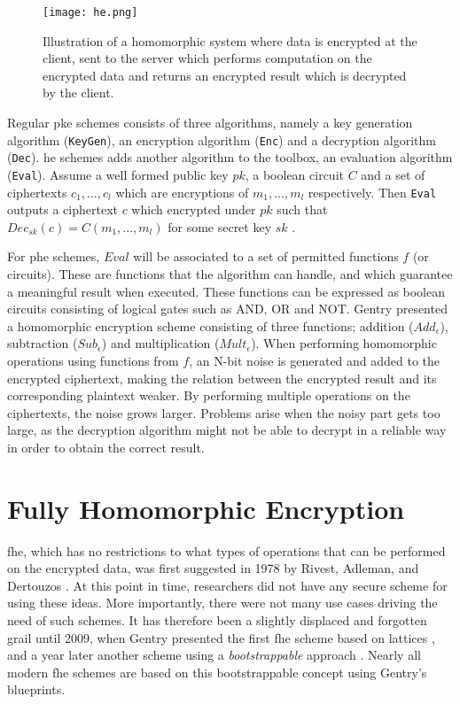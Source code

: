 \begin{figure}[h]
	\centering
	\texttt{[image: he.png]}
	\caption{Illustration of a homomorphic system where data is encrypted at the client, sent to the server which performs computation on the encrypted data and returns an encrypted result which is decrypted by the client.}
	\label{fig:he_ill}
\end{figure}

Regular \gls{pke} schemes consists of three algorithms, namely a key generation algorithm (\texttt{KeyGen}), an encryption algorithm (\texttt{Enc}) and a decryption algorithm (\texttt{Dec}). \gls{he} schemes adds another algorithm to the toolbox, an evaluation algorithm (\texttt{Eval}).  Assume a well formed public key $pk$, a boolean circuit $C$ and a set of ciphertexts $c_1, ..., c_l$ which are encryptions of $m_1, ..., m_l$ respectively. Then \texttt{Eval} outputs a ciphertext $c$ which encrypted under $pk$ such that $Dec_{sk}(c) = C(m_1, ..., m_l)$ for some secret key $sk$ \cite{damgaard2012secure}.


For \gls{phe} schemes, $Eval$ will be associated to a set of permitted functions $f$ (or circuits). These are functions that the algorithm can handle, and which guarantee a meaningful result when executed. These functions can be expressed as boolean circuits consisting of logical gates such as AND, OR and NOT. Gentry \cite{Gentry_computing_arb_func_enc_data} presented a homomorphic encryption scheme consisting of three functions; addition ($Add_{\epsilon}$), subtraction ($Sub_{\epsilon}$) and multiplication ($Mult_{\epsilon}$). When performing homomorphic operations using functions from $f$, an N-bit noise is generated and added to the encrypted ciphertext, making the relation between the encrypted result and its corresponding plaintext weaker. By performing multiple operations on the ciphertexts, the noise grows larger. Problems arise when the noisy part gets too large, as the decryption algorithm might not be able to decrypt in a reliable way in order to obtain the correct result.

\section{Fully Homomorphic Encryption}

\Gls{fhe}, which has no restrictions to what types of operations that can be performed on the encrypted data, was first suggested in 1978 by Rivest, Adleman, and Dertouzos \cite{rivest1978data}. At this point in time, researchers did not have any secure scheme for using these ideas. More importantly, there were not many use cases driving the need of such schemes. It has therefore been a slightly displaced and forgotten grail until 2009,
when Gentry presented the first \gls{fhe} scheme based on lattices \cite{Gentry_first_lattices}, and a year later another scheme using a \emph{bootstrappable} approach \citep{Gentry_computing_arb_func_enc_data}. Nearly all modern \gls{fhe} schemes are based on this bootstrappable concept using Gentry's blueprints. 

